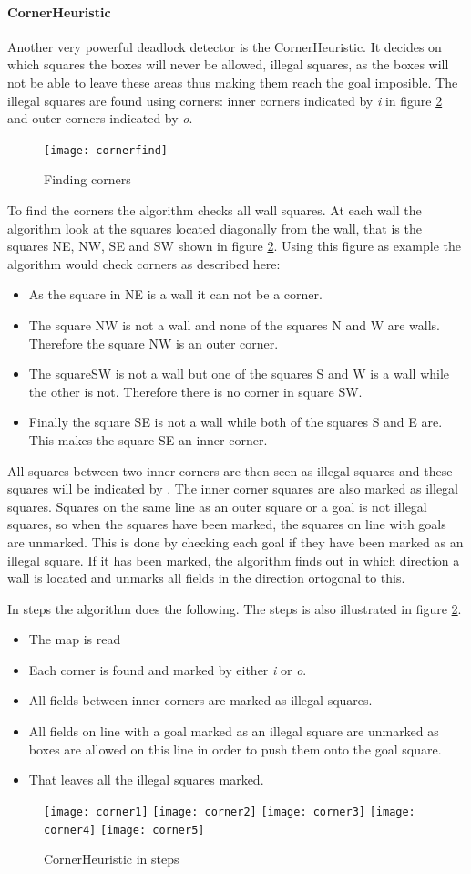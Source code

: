 \paragraph{CornerHeuristic}Another very powerful deadlock detector is the CornerHeuristic. It decides on which squares the boxes will never be allowed, illegal squares, as the boxes will not be able to leave these areas thus making them reach the goal imposible. The illegal squares are found using corners: inner corners indicated by \textit{i} in figure \ref{fig:cornerheuristic} and outer corners indicated by \textit{o}.
\begin{figure}[htp]
	\centering
	\texttt{[image: cornerfind]}
	\caption{Finding corners}
	\label{fig:cornerheuristic}
\end{figure}
To find the corners the algorithm checks all wall squares. At each wall the algorithm look at the squares located diagonally from the wall, that is the squares NE, NW, SE and SW shown in figure \ref{fig:cornerheuristic}. Using this figure as example the algorithm would check corners as described here:
\begin{itemize}
	\item As the square in NE is a wall it can not be a corner.
	\item The square NW is not a wall and none of the squares N and W are walls. Therefore the square NW is an outer corner.
	\item The squareSW is not a wall but one of the squares S and W is a wall while the other is not. Therefore there is no corner in square SW.
	\item Finally the square SE is not a wall while both of the squares S and E are. This makes the square SE an inner corner.
\end{itemize}

All squares between two inner corners are then seen as illegal squares and these squares will be indicated by \textit{\!}. The inner corner squares are also marked as illegal squares. Squares on the same line as an outer square or a goal is not illegal squares, so when the squares have been marked, the squares on line with goals are unmarked. This is done by checking each goal if they have been marked as an illegal square. If it has been marked, the algorithm finds out in which direction a wall is located and unmarks all fields in the direction ortogonal to this.

In steps the algorithm does the following. The steps is also illustrated in figure \ref{fig:cornerheuristic}.
\begin{itemize}
	\item The map is read
	\item Each corner is found and marked by either \textit{i} or \textit{o}.
	\item All fields between inner corners are marked as illegal squares.
	\item All fields on line with a goal marked as an illegal square are unmarked as boxes are allowed on this line in order to push them onto the goal square.
	\item That leaves all the illegal squares marked.
\end{itemize}

\begin{figure}[htp]
	\centering
	\texttt{[image: corner1]}
	\texttt{[image: corner2]}
	\texttt{[image: corner3]}
	\texttt{[image: corner4]}
	\texttt{[image: corner5]}
	\caption{CornerHeuristic in steps}
	\label{fig:cornerheuristic}
\end{figure}

